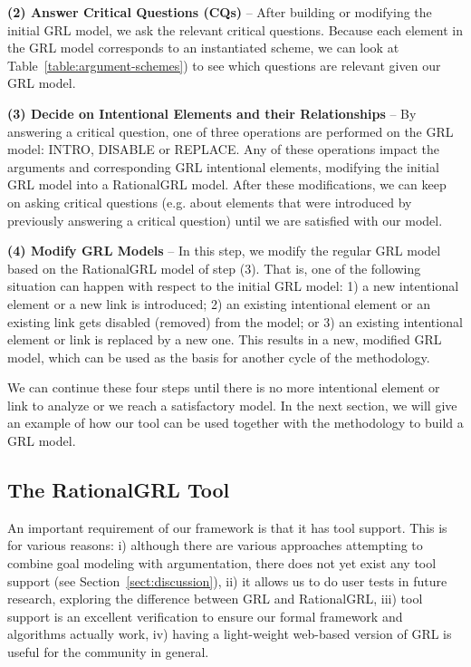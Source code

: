 \textbf{(2) Answer Critical Questions (CQs)} -- After building or modifying the initial GRL model, we ask the relevant critical questions. Because each element in the GRL model corresponds to an instantiated scheme, we can look at Table~\ref{table:argument-schemes}) to see which questions are relevant given our GRL model. 

\textbf{(3) Decide on Intentional Elements and their Relationships} -- By answering a critical question, one of three operations are performed on the GRL model: \textsf{INTRO}, \textsf{DISABLE} or \textsf{REPLACE}. Any of these operations impact the arguments and corresponding GRL intentional elements, modifying the initial GRL model into a RationalGRL model. After these modifications, we can keep on asking critical questions (e.g. about elements that were introduced by previously answering a critical question) until we are satisfied with our model.   

\textbf{(4) Modify GRL Models} -- In this step, we modify the regular GRL model based on the RationalGRL model of step (3). That is, one of the following situation can happen with respect to the initial GRL model: 1) a new intentional element or a new link is introduced; 2) an existing intentional element or an existing link gets disabled (removed) from the model; or 3) an existing intentional element or link is replaced by a new one. This results in a new, modified GRL model, which can be used as the basis for another cycle of the methodology. 

We can continue these four steps until there is no more intentional element or link to analyze or we reach a satisfactory model. In the next section, we will give an example of how our tool can be used together with the methodology to build a GRL model.  

\subsection{The RationalGRL Tool}
\label{sect:tool}

An important requirement of our framework is that it has tool support. This is for various reasons: i) although there are various approaches attempting to combine goal modeling with argumentation, there does not yet exist any tool support (see Section~\ref{sect:discussion}), ii) it allows us to do user tests in future research, exploring the difference between GRL and RationalGRL, iii) tool support is an excellent verification to ensure our formal framework and algorithms actually work, iv) having a light-weight web-based version of GRL is useful for the community in general.

